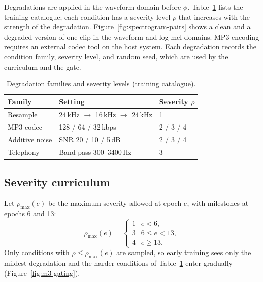 Degradations are applied in the waveform domain before $\phi$. Table~\ref{tab:degradations} lists the training catalogue; each condition has a severity level $\rho$ that increases with the strength of the degradation. Figure~\ref{fig:spectrogram-pairs} shows a clean and a degraded version of one clip in the waveform and log-mel domains. MP3 encoding requires an external codec tool on the host system. Each degradation records the condition family, severity level, and random seed, which are used by the curriculum and the gate.

\begin{table}[htbp]
\centering
\caption{Degradation families and severity levels (training catalogue).}
\label{tab:degradations}
\small
\begin{tabular}{@{}lll@{}}
\toprule
Family & Setting & Severity $\rho$ \\
\midrule
Resample & 24\,kHz $\rightarrow$ 16\,kHz $\rightarrow$ 24\,kHz & 1 \\
MP3 codec & 128 / 64 / 32\,kbps & 2 / 3 / 4 \\
Additive noise & SNR 20 / 10 / 5\,dB & 2 / 3 / 4 \\
Telephony & Band-pass 300--3400\,Hz & 3 \\
\bottomrule
\end{tabular}
\end{table}


\subsection{Severity curriculum}

Let $\rho_{\max}(e)$ be the maximum severity allowed at epoch $e$, with milestones at epochs 6 and 13:
\begin{equation}
\rho_{\max}(e) = \begin{cases}
1 & e < 6, \\
3 & 6 \le e < 13, \\
4 & e \ge 13 .
\end{cases}
\label{eq:curriculum}
\end{equation}
Only conditions with $\rho \le \rho_{\max}(e)$ are sampled, so early training sees only the mildest degradation and the harder conditions of Table~\ref{tab:degradations} enter gradually (Figure~\ref{fig:m3-gating}).

